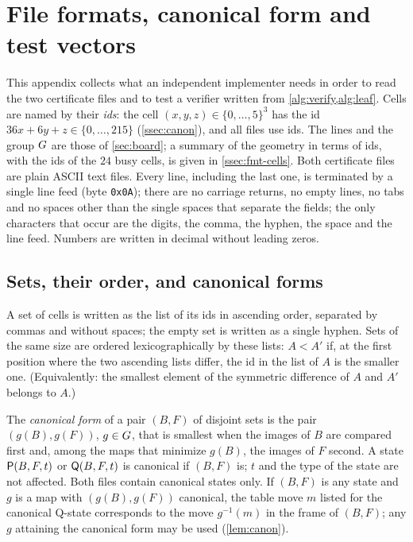 \section{File formats, canonical form and test vectors}\label{sec:formats}


This appendix collects what an independent implementer needs in order to read the two certificate files
and to test a verifier written from \cref{alg:verify,alg:leaf}. Cells are named by their \emph{ids}: the
cell $(x,y,z)\in\{0,\dots,5\}^3$ has the id $36x+6y+z\in\{0,\dots,215\}$ (\cref{ssec:canon}), and all files
use ids. The lines and the group $G$ are those of \cref{sec:board}; a summary of the geometry in terms of
ids, with the ids of the $24$ busy cells, is given in \cref{ssec:fmt-cells}. Both certificate files are
plain ASCII text files. Every line,
including the last one, is terminated by a single line feed (byte \texttt{0x0A}); there are no carriage
returns, no empty lines, no tabs and no spaces other than the single spaces that separate the fields;
the only characters that occur are the digits, the comma, the hyphen, the space and the line feed.
Numbers are written in decimal without leading zeros.

\subsection{Sets, their order, and canonical forms}\label{ssec:fmt-canon}

A set of cells is written as the list of its ids in ascending order, separated by commas and without
spaces; the empty set is written as a single hyphen. Sets of the same size are ordered
lexicographically by these lists: $A<A'$ if, at the first position where the two ascending lists differ,
the id in the list of $A$ is the smaller one. (Equivalently: the smallest element of the symmetric
difference of $A$ and $A'$ belongs to $A$.)

The \emph{canonical form} of a pair $(B,F)$ of disjoint sets is the pair $(g(B),g(F))$, $g\in G$, that is
smallest when the images of $B$ are compared first and, among the maps that minimize $g(B)$, the images
of $F$ second. A state $\mathsf{P}(B,F,t)$ or $\mathsf{Q}(B,F,t)$ is canonical if $(B,F)$ is; $t$ and the type of the
state are not affected. Both files contain canonical states only. If $(B,F)$ is any state and $g$ is a map
with $(g(B),g(F))$ canonical, the table move $m$ listed for the canonical Q-state corresponds to the move
$g^{-1}(m)$ in the frame of $(B,F)$; any $g$ attaining the canonical form may be used (\cref{lem:canon}).

